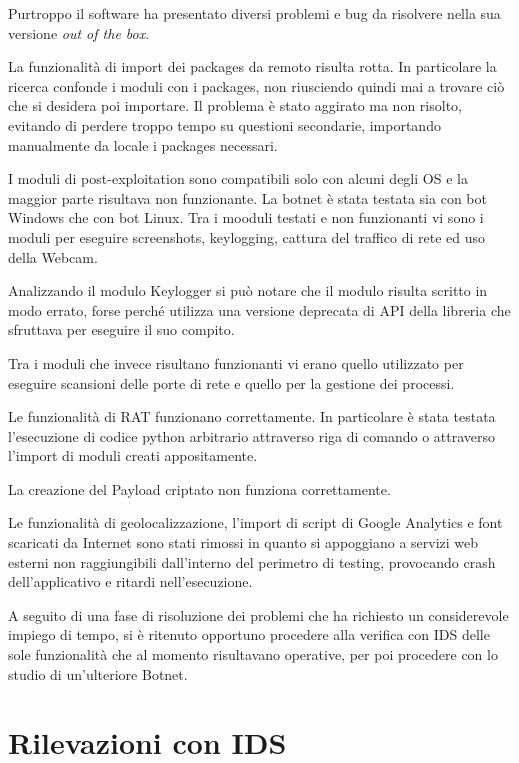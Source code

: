 Purtroppo il software ha presentato diversi problemi e bug da risolvere nella sua versione \textit{out of the box}. 

La funzionalità di import dei   packages da remoto risulta rotta. In particolare la ricerca confonde i moduli con i packages,  non riusciendo quindi mai a trovare ciò che si desidera poi importare. Il problema è stato aggirato ma non risolto, evitando di perdere troppo tempo su questioni secondarie, importando manualmente da locale i packages necessari.

I moduli di post-exploitation sono compatibili solo con alcuni degli OS e la maggior parte risultava non funzionante. 
La botnet è stata testata sia con bot Windows che con bot Linux.
Tra i mooduli  testati e non funzionanti vi sono i moduli per eseguire screenshots, keylogging, cattura del traffico di rete ed uso della  Webcam.

Analizzando il modulo Keylogger si può notare che il modulo risulta scritto in modo errato, forse perché utilizza una versione deprecata di API della libreria che sfruttava per eseguire il suo compito. 

Tra i moduli che invece risultano funzionanti vi erano quello utilizzato per eseguire scansioni delle porte di rete e quello per la gestione dei processi.

Le funzionalità di RAT funzionano correttamente.
In particolare è stata testata l'esecuzione di codice python arbitrario attraverso riga di comando o  attraverso l'import di moduli creati appositamente.

La  creazione del Payload criptato non funziona correttamente.


Le funzionalità di geolocalizzazione, l'import di script di Google Analytics e font scaricati da Internet sono stati rimossi in quanto si appoggiano a servizi web esterni non raggiungibili dall'interno del perimetro di testing, provocando crash dell'applicativo e ritardi nell'esecuzione.



A seguito di una fase di risoluzione dei problemi che ha richiesto un considerevole impiego di tempo, si è ritenuto opportuno procedere alla verifica con IDS delle sole funzionalità che al momento risultavano operative, per poi procedere con lo studio di un'ulteriore Botnet.

\chapter{Rilevazioni con IDS}


